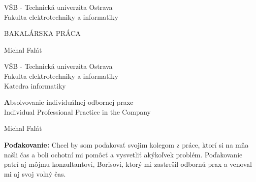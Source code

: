 \documentclass[11pt, oneside]{report}
\def\mfrok{2018}
\def\mfnazov{BAKALÁRSKA PRÁCA}
\def\mfnazovprace{Absolvovanie individuálnej odbornej praxe\\
Individual Professional Practice in the
Company
}
\def\mfautor{Michal Falát}
\begin{document}
  


\thispagestyle{empty}

\begin{center}
\sc\large
VŠB - Technická univerzita Ostrava\\
Fakulta elektrotechniky a informatiky


\vfill

{\LARGE\mfnazov}\\
\end{center}

\vfill

{\sc\large 
\noindent \mfrok \hfill  \hfill \mfautor
}

\eject %


\thispagestyle{empty}
\noindent
\begin{center}
{\LARGE
V\v SB - Technická univerzita Ostrava\\
Fakulta elektrotechniky a informatiky\\
Katedra informatiky\\}

\vfill

{\huge\textbf\mfnazovprace}\\
\end{center}

\vfill



{\LARGE
\noindent \mfrok \hfill  \hfill \mfautor
}

\eject %

%
\newpage 


\newpage 
\thispagestyle{empty}

\vspace*{\fill}
{\bf Poďakovanie:} Chcel by som poďakovať svojim kolegom  z práce, ktorí si na mňa našli čas a boli ochotní mi pomôcť a vysvetliť akýkoľvek problém. Poďakovanie patrí aj môjmu konzultantovi, Borisovi, ktorý mi zastrešil odbornú prax a venoval mi aj svoj voľný čas.


\end{document}
